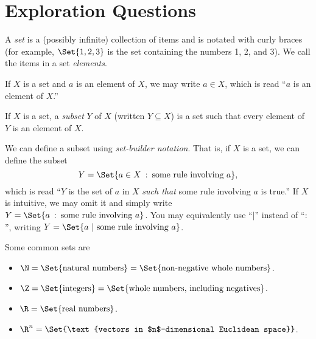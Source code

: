 \newpage
\section*{Exploration Questions}
	

\vspace{.5cm}
	\begin{numberlessdefinition}[Set]
		A \emph{set} is a (possibly infinite) collection of items
		and is notated with curly braces (for example, $\Set{1,2,3}$ is
		the set containing the numbers 1, 2, and 3).  We call the items in
		a set \emph{elements}.

		If $X$ is a set and $a$ is an element of $X$, we may write $a\in X$,
		which is read ``$a$ is an element of $X$.''

		If $X$ is a set, a \emph{subset} $Y$ of $X$ (written $Y\subseteq X$)
		is a set such that every element of $Y$ is an element of $X$.

		We can define a subset using \emph{set-builder notation}.
		That is, if $X$ is a set, we can define the subset 
		\[
			Y= \Set{a\in X\given\text{some rule involving }a},
		\]
		which is read ``$Y$ is the set of $a$ in $X$ \emph{such that} some rule
		involving $a$ is true.''  If $X$ is intuitive, we may omit it and
		simply write $Y=\Set{a\given\text{some rule involving }a}$.  
		You may equivalently
		use ``$|$'' instead of ``$:$'', writing $Y=\Set{a\ |\ \text{some rule involving }a}$.
	\end{numberlessdefinition}

	\begin{numberlessdefinition}
		Some common sets are
		\begin{itemize}
			\item[] $\N=\Set{\text{natural numbers}} = \Set{\text{non-negative whole numbers}}$.
			\item[] $\Z=\Set{\text{integers}} = \Set{\text{whole numbers, including negatives}}$.
			\item[] $\R=\Set{\text{real numbers}}$.
			\item[] $\R^n=\Set{\text{vectors in $n$-dimensional Euclidean space}}$.
		\end{itemize}
	\end{numberlessdefinition}


